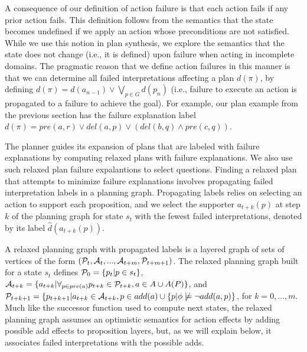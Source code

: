 \documentclass{article}
\begin{document}
A consequence of our definition of action failure is that each action fails if
any prior action fails.  This definition follows from the semantics that the
state becomes undefined if we apply an action whose preconditions are not
satisfied.  While we use this notion in plan synthesis, we explore the semantics
that the state does not change (i.e., it is defined) upon failure when acting in
incomplete domains.  The pragmatic reason that we define action failures in this
manner is that we can determine all failed interpretations affecting a plan $d(\pi)$,
by defining $d(\pi) = d({a}_{n-1}) \vee \bigvee_{p \in G} d(p_n)$ (i.e.,
failure to execute an action is propagated to a
failure to achieve the goal). For example, our plan example from the previous
section has the failure explanation label $d(\pi) = 
pre(a, r) \vee  del(a, p) \vee (del(b, q) \wedge pre(c, q))$.

 The  planner
\citep{bryce-icaps11} guides its expansion of plans that are labeled with
failure explanations by computing relaxed plans with failure explanations.  We
also use such relaxed plan failure expalantions to select questions.  Finding a
relaxed plan that attempts to minimize failure explanations involves propagating
failed interpretation labels in a planning graph.  Propagating labels relies on
selecting an action to support each proposition, and we select the supporter
$a_{t+k}(p)$ at step $k$ of the planning graph for state $s_t$ with the
fewest failed interpretations, denoted by its label $\hat{d}(a_{t+k}(p))$. 

A relaxed planning graph with propagated labels is a layered graph of sets of
vertices of the form $({\cal P}_t, {\cal A}_t, ..., {\cal A}_{t+m},
{\cal P}_{t+m+1})$. The relaxed planning graph built for a state
${s}_t$ defines ${\cal P}_0 = \{{p}_t | p \in {s}_t\}$,
${\cal A}_{t+k} = \{ {a}_{t+k} | \forall_{p \in {pre}({a})}
{p}_{t+k} \in {\cal P}_{t+k}, {a} \in {A} \cup A(P)\}$, and
${\cal P}_{t+k+1} = \{p_{t+k+1} | {a}_{t+k} \in {\cal A}_{t+k}, p
\in {add}({a}) \cup \{p | \phi\not\models\neg add({a}, p)\}$, for $k
= 0, ..., m$.  Much like the successor function used to compute next states, the
relaxed planning graph assumes an optimistic semantics for action effects by
adding possible add effects to proposition layers, but, as we will explain
below, it associates failed interpretations with the possible adds.
\end{document}
